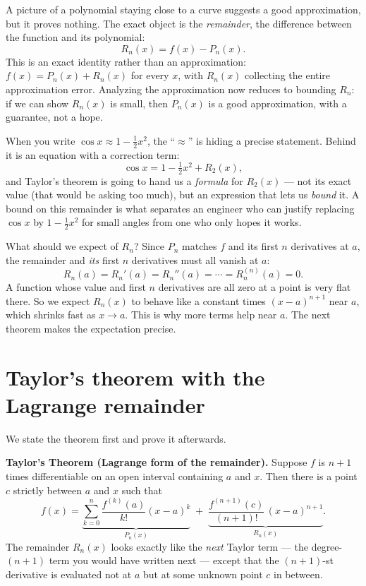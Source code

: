 A picture of a polynomial staying close to a curve suggests a good approximation,
but it proves nothing. The exact
object is the \emph{remainder}, the difference between the function and its
polynomial:
\[
  R_n(x) = f(x) - P_n(x).
\]
This is an exact identity rather than an approximation: $f(x) = P_n(x) + R_n(x)$
for every $x$, with $R_n(x)$ collecting the entire approximation error. Analyzing the approximation now reduces to bounding
$R_n$: if we can show $R_n(x)$ is small, then $P_n(x)$ is a good approximation, with
a guarantee, not a hope.

\begin{happeningbox}
When you write $\cos x \approx 1 - \tfrac12 x^2$, the ``$\approx$'' is hiding a
precise statement. Behind it is an equation with a correction term:
\[
  \cos x = 1 - \tfrac12 x^2 + R_2(x),
\]
and Taylor's theorem is going to hand us a \emph{formula} for $R_2(x)$ --- not its
exact value (that would be asking too much), but an expression that lets us
\emph{bound} it. A bound on this remainder is what separates an engineer who can
justify replacing $\cos x$ by $1 - \tfrac12 x^2$ for small angles from one who only
hopes it works.
\end{happeningbox}

What should we expect of $R_n$? Since $P_n$
matches $f$ and its first $n$ derivatives at $a$, the remainder and \emph{its} first
$n$ derivatives must all vanish at $a$:
\[
  R_n(a) = R_n'(a) = R_n''(a) = \cdots = R_n^{(n)}(a) = 0.
\]
A function whose value and first $n$ derivatives are all zero at a point is very
flat there. So we expect $R_n(x)$ to behave like a constant times $(x-a)^{n+1}$ near
$a$, which shrinks fast as $x \to a$. This is why more terms help near $a$. The next
theorem makes the expectation precise.

\section{Taylor's theorem with the Lagrange remainder}

We state the theorem first and prove it afterwards.

\begin{focusbox}
\textbf{Taylor's Theorem (Lagrange form of the remainder).} Suppose $f$ is $n+1$
times differentiable on an open interval containing $a$ and $x$. Then there is a
point $c$ strictly between $a$ and $x$ such that
\[
  f(x) = \underbrace{\sum_{k=0}^{n} \frac{f^{(k)}(a)}{k!}(x-a)^k}_{P_n(x)}
       \; + \; \underbrace{\frac{f^{(n+1)}(c)}{(n+1)!}\,(x-a)^{n+1}}_{R_n(x)}.
\]
The remainder $R_n(x)$ looks exactly like the \emph{next} Taylor term --- the
degree-$(n+1)$ term you would have written next --- except that the
$(n+1)$-st derivative is evaluated not at $a$ but at some unknown point $c$ in between.
\end{focusbox}

